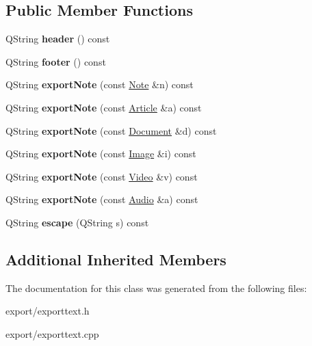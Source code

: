 \subsection*{Public Member Functions}
\begin{DoxyCompactItemize}
\item 
\hypertarget{class_export_text_a7ea0a93dbdac02b995137d3dce5ea338}{Q\-String {\bfseries header} () const }\label{class_export_text_a7ea0a93dbdac02b995137d3dce5ea338}

\item 
\hypertarget{class_export_text_a97c326a40002f7e14872654304be324d}{Q\-String {\bfseries footer} () const }\label{class_export_text_a97c326a40002f7e14872654304be324d}

\item 
\hypertarget{class_export_text_a352d471dd31f2370948654f8b1124079}{Q\-String {\bfseries export\-Note} (const \hyperlink{class_note}{Note} \&n) const }\label{class_export_text_a352d471dd31f2370948654f8b1124079}

\item 
\hypertarget{class_export_text_a65a97d2bc20cebb1edfd6b1014177632}{Q\-String {\bfseries export\-Note} (const \hyperlink{class_article}{Article} \&a) const }\label{class_export_text_a65a97d2bc20cebb1edfd6b1014177632}

\item 
\hypertarget{class_export_text_a17ac3513e7ef98ab7598bb149b6bd115}{Q\-String {\bfseries export\-Note} (const \hyperlink{class_document}{Document} \&d) const }\label{class_export_text_a17ac3513e7ef98ab7598bb149b6bd115}

\item 
\hypertarget{class_export_text_af9649806a6e6fa3996e14ef8ff31a196}{Q\-String {\bfseries export\-Note} (const \hyperlink{class_image}{Image} \&i) const }\label{class_export_text_af9649806a6e6fa3996e14ef8ff31a196}

\item 
\hypertarget{class_export_text_a9b8613a967b7a0b7c4978871321df7e2}{Q\-String {\bfseries export\-Note} (const \hyperlink{class_video}{Video} \&v) const }\label{class_export_text_a9b8613a967b7a0b7c4978871321df7e2}

\item 
\hypertarget{class_export_text_a335530d5d308f398e21510ad9b382494}{Q\-String {\bfseries export\-Note} (const \hyperlink{class_audio}{Audio} \&a) const }\label{class_export_text_a335530d5d308f398e21510ad9b382494}

\item 
\hypertarget{class_export_text_a3d055656e0bdea64b7571c26238888d3}{Q\-String {\bfseries escape} (Q\-String s) const }\label{class_export_text_a3d055656e0bdea64b7571c26238888d3}

\end{DoxyCompactItemize}
\subsection*{Additional Inherited Members}


The documentation for this class was generated from the following files\-:\begin{DoxyCompactItemize}
\item 
export/exporttext.\-h\item 
export/exporttext.\-cpp\end{DoxyCompactItemize}
